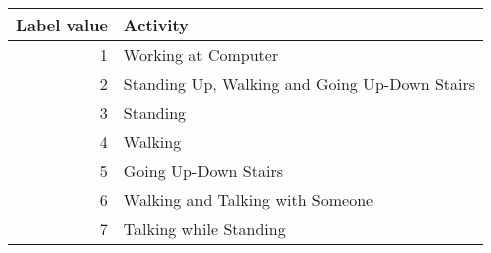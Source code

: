 \begin{tabular}{rl}
\toprule
   Label value &  Activity \\
\midrule
  1 & Working at Computer               \\
  2 & Standing Up, Walking and Going Up-Down Stairs               \\
  3 & Standing                 \\
  4 & Walking     \\
  5 & Going Up-Down Stairs                \\
  6 & Walking and Talking with Someone                    \\
  7 & Talking while Standing          \\

\bottomrule
\end{tabular}
